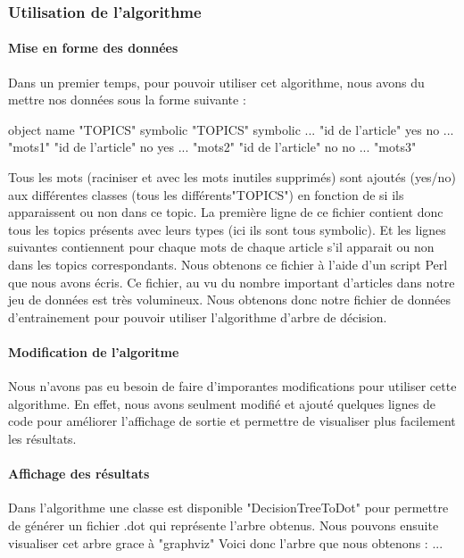 \subsubsection{Utilisation de l'algorithme}

\paragraph{Mise en forme des données}  
Dans un premier temps, pour pouvoir utiliser cet algorithme, nous avons du mettre nos données sous la forme suivante :

object name "TOPICS" symbolic "TOPICS" symbolic ...
"id de l'article" yes no ... "mots1"
"id de l'article" no yes ... "mots2"
"id de l'article" no no ... "mots3"

Tous les mots (raciniser et avec les mots inutiles supprimés) sont ajoutés (yes/no) aux différentes classes (tous les différents"TOPICS") en fonction de si ils apparaissent ou non dans ce topic.
La première ligne de ce fichier contient donc tous les topics présents avec leurs types (ici ils sont tous symbolic). Et les lignes suivantes contiennent pour chaque mots de chaque article s'il apparait ou non dans les topics correspondants.
Nous obtenons ce fichier à l'aide d'un script Perl que nous avons écris. Ce fichier, au vu du nombre important d'articles dans notre jeu de données est très volumineux. Nous obtenons donc notre fichier de données d'entrainement pour pouvoir utiliser l'algorithme d'arbre de décision.

\paragraph{Modification de l'algoritme}  
Nous n'avons pas eu besoin de faire d'imporantes modifications pour utiliser cette algorithme. En effet, nous avons seulment modifié et ajouté quelques lignes de code pour améliorer l'affichage de sortie et permettre de visualiser plus facilement les résultats.

\paragraph{Affichage des résultats}
Dans l'algorithme une classe est disponible "DecisionTreeToDot" pour permettre de générer un fichier .dot qui représente l'arbre obtenus. Nous pouvons ensuite visualiser cet arbre grace à "graphviz"
Voici donc l'arbre que nous obtenons :
...

